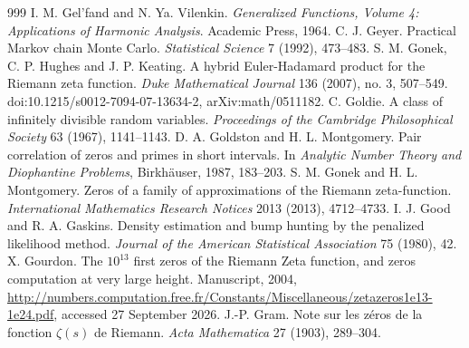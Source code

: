 \begin{thebibliography}{999}
 I. M. Gel'fand and N. Ya. Vilenkin. \emph{Generalized Functions, Volume 4: Applications of Harmonic Analysis}. Academic Press, 1964.
 C. J. Geyer. Practical Markov chain Monte Carlo. \emph{Statistical Science} 7 (1992), 473--483.
 S. M. Gonek, C. P. Hughes and J. P. Keating. A hybrid Euler-Hadamard product for the Riemann zeta function. \emph{Duke Mathematical Journal} 136 (2007), no. 3, 507--549. doi:10.1215/s0012-7094-07-13634-2, arXiv:math/0511182.
 C. Goldie. A class of infinitely divisible random variables. \emph{Proceedings of the Cambridge Philosophical Society} 63 (1967), 1141--1143.
 D. A. Goldston and H. L. Montgomery. Pair correlation of zeros and primes in short intervals. In \emph{Analytic Number Theory and Diophantine Problems}, Birkh\"auser, 1987, 183--203.
 S. M. Gonek and H. L. Montgomery. Zeros of a family of approximations of the Riemann zeta-function. \emph{International Mathematics Research Notices} 2013 (2013), 4712--4733.
 I. J. Good and R. A. Gaskins. Density estimation and bump hunting by the penalized likelihood method. \emph{Journal of the American Statistical Association} 75 (1980), 42.
 X. Gourdon. The $10^{13}$ first zeros of the Riemann Zeta function, and zeros computation at very large height. Manuscript, 2004, \url{http://numbers.computation.free.fr/Constants/Miscellaneous/zetazeros1e13-1e24.pdf}, accessed 27 September 2026.
 J.-P. Gram. Note sur les z\'eros de la fonction $\zeta(s)$ de Riemann. \emph{Acta Mathematica} 27 (1903), 289--304.

\end{thebibliography}
